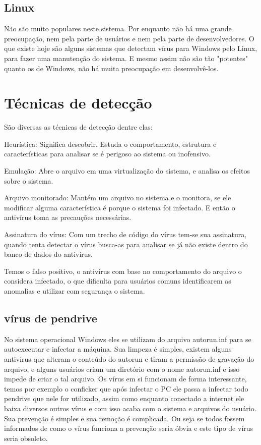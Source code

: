 \subsection{Linux}
	Não são muito populares neste sistema. Por enquanto não há uma grande preocupação, nem pela parte de usuários e nem pela parte de desenvolvedores. O que existe hoje são alguns sistemas que detectam vírus para Windows pelo Linux, para fazer uma manutenção do sistema. E mesmo assim não são tão "potentes" quanto os de Windows, não há muita preocupação em desenvolvê-los.


\section{Técnicas de detecção}
	São diversas as técnicas de detecção dentre elas:
	
	
	Heurística: Significa descobrir. Estuda o comportamento, estrutura e características para analisar se é perigoso ao sistema ou inofensivo.
	
	
	Emulação: Abre o arquivo em uma virtualização do sistema, e analisa os efeitos sobre o sistema.
	
	
	Arquivo monitorado: Mantém um arquivo no sistema e o monitora, se ele modificar alguma característica é porque o sistema foi infectado. E então o antivírus toma as precauções necessárias.
	
	
	Assinatura do vírus: Com um trecho de código do vírus tem-se sua assinatura, quando tenta detectar o vírus busca-as para analisar se já não existe dentro do banco de dados do antivírus.
	
	
	Temos o falso positivo, o antivírus com base no comportamento do arquivo o considera infectado, o que dificulta para usuários comuns identificarem as anomalias e utilizar com segurança o sistema.

\subsection{vírus de pendrive}
	No sistema operacional Windows eles se utilizam do arquivo autorun.inf para se autoexecutar e infectar a máquina. Sua limpeza é simples, existem alguns antivírus que alteram o conteúdo do autorun e tiram a permissão de gravação do arquivo, e alguns usuários criam um diretório com o nome autorun.inf e isso impede de criar o tal arquivo. Os vírus em si funcionam de forma interessante, temos por exemplo o conficker que após infectar o PC ele passa a infectar todo pendrive que nele for utilizado, assim como enquanto conectado a internet ele baixa diversos outros vírus e com isso acaba com o sistema e arquivos do usuário. Sua prevenção é simples e sua remoção é complicada. Ou seja se todos fossem informados de como o vírus funciona a prevenção seria óbvia e este tipo de vírus seria obsoleto.

